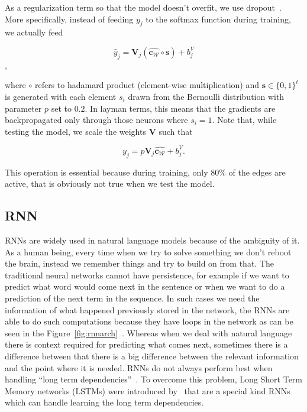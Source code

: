 As a regularization term so that the model doesn't overfit, we use dropout~\cite{srivastava2014dropout}. More specifically, instead of feeding $y_j$ to the softmax function during training, we actually feed 

\[ \widehat{y}_j = \mathbf{V}_j( \mathbf{\widehat{c_{\mathcal{W}}}} \circ \mathbf{s}) + b^{V}_j
\],
 
where $\circ$ refers to hadamard product (element-wise multiplication) and $\mathbf{s} \in \{0,1\}^t$ is generated with each element $s_i$ drawn from the Bernoulli distribution with parameter $p$ set to $0.2$. In layman terms, this means that the gradients are backpropagated only through those neurons where $s_i = 1$. Note that, while testing the model, we scale the weights $\mathbf{V}$ such that 

\[y_j = p\mathbf{V}_j \mathbf{\widehat{c_{\mathcal{W}}}} + b^{V}_j.\]

This operation is essential because during training, only $80\%$ of the edges are active, that is obviously not true when we test the model. 


\subsection{RNN}
RNNs are widely used in natural language models because of the ambiguity of it. As a human being, every time when we try to solve something we don't reboot the brain, instead we remember things and try to build on from that. The traditional neural networks cannot have persistence, for example if we want to predict what word would come next in the sentence or when we want to do a prediction of the next term in the sequence. In such cases we need the information of what happened previously stored in the network, the RNNs are able to do such computations because they have loops in the network as can be seen in the Figure~\ref{fig:rnnarch}~\cite{chung2015recurrent}. Whereas when we deal with natural language there is context required for predicting what comes next, sometimes there is a difference between that there is a big difference between the relevant information and the point where it is needed. RNNs do not always perform best when handling ``long term dependencies''~\cite{bengio1994learning}. To overcome this problem, Long Short Term Memory networks (LSTMs) were introduced by~\cite{hochreiter1997long} that are a special kind RNNs which can handle learning the long term dependencies. 

